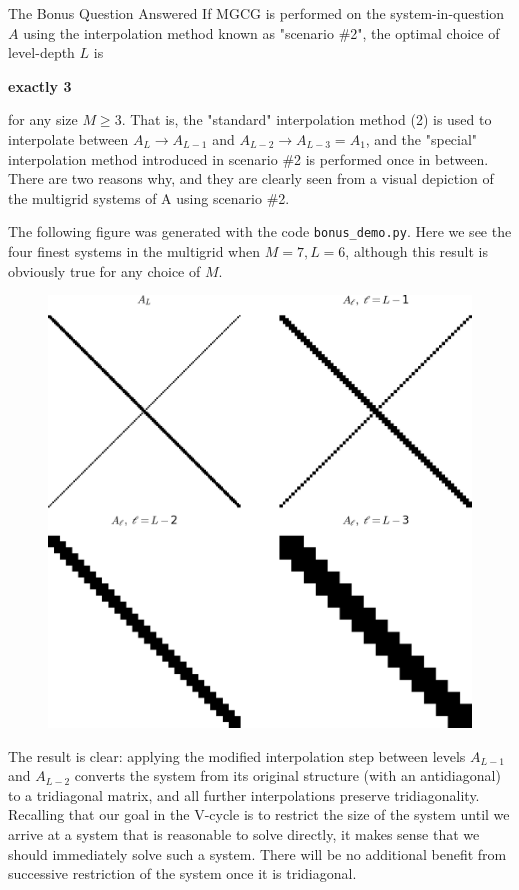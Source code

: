 \documentclass[10pt]{article}
\theoremstyle{definition}
\begin{document}
\begin{section}{The Bonus Question Answered}
If MGCG is performed on the system-in-question $A$ using the interpolation method known as "scenario \#2", the optimal choice of level-depth $L$ is \begin{huge}\textbf{exactly 3}\end{huge} for any size $M\ge3$. That is, the "standard" interpolation method (2) is used to interpolate between $A_L \rightarrow A_{L-1}$ and $A_{L-2}\rightarrow A_{L-3} = A_{1}$, and the "special" interpolation method introduced in scenario \#2 is performed once in between. There are two reasons why, and they are clearly seen from a visual depiction of the multigrid systems of A using scenario \#2.



The following figure was generated with the code \texttt{bonus\_demo.py}. Here we see the four finest systems in the multigrid when $M=7, L=6$, although this result is obviously true for any choice of $M$.
\begin{figure}[p]
\begin{center}
\includegraphics[width=0.8\linewidth]{scenario2_spy.png}
\end{center}
\end{figure}

The result is clear: applying the modified interpolation step between levels $A_{L-1}$ and $A_{L-2}$ converts the system from its original structure (with an antidiagonal) to a tridiagonal matrix, and all further interpolations preserve tridiagonality. Recalling that our goal in the V-cycle is to restrict the size of the system until we arrive at a system that is reasonable to solve directly, it makes sense that we should immediately solve such a system. There will be no additional benefit from successive restriction of the system once it is tridiagonal.


\end{section}
\end{document}

